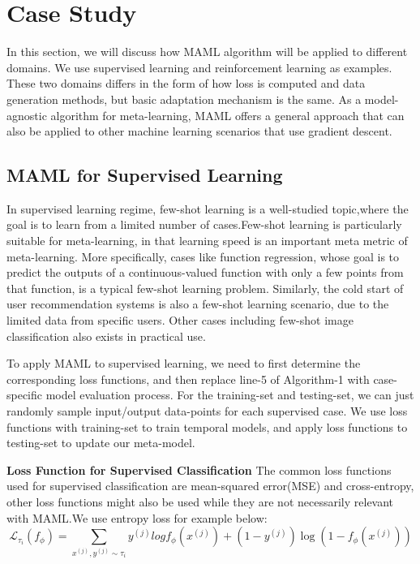 \section{Case Study}

In this section, we will discuss how MAML algorithm will be applied to different domains. We use supervised learning and reinforcement learning as examples. These two domains differs in the form of how loss is computed and data generation methods, but basic adaptation mechanism is the same. As a model-agnostic algorithm for meta-learning, MAML offers a general approach that can also be applied to other machine learning scenarios that use gradient descent.

\subsection{MAML for Supervised Learning}

In supervised learning regime, few-shot learning is a well-studied topic,where the goal is to learn from a limited number of cases.Few-shot learning is particularly suitable for meta-learning, in that learning speed is an important meta metric of meta-learning. More specifically, cases like function regression, whose goal is to predict the outputs of a continuous-valued function with only a few points from that function, is a typical few-shot learning problem. Similarly, the cold start of user  recommendation systems is also a few-shot learning scenario, due to the limited data from specific users. Other cases including few-shot image classification also exists in practical use.

To apply MAML to supervised learning, we need to first determine the corresponding loss functions, and then replace line-5 of Algorithm-1 with case-specific model evaluation process. For the training-set and testing-set, we can just randomly sample input/output data-points for each supervised case. We use loss functions with training-set to train temporal models, and apply loss functions to testing-set to update our meta-model.

\textbf{Loss Function for Supervised Classification}
The common loss functions used for supervised classification are mean-squared error(MSE) and cross-entropy, other loss functions might also be used while they are not necessarily relevant with MAML.We use entropy loss for example below:
\begin{equation}
    \label{loss-class}
    \mathcal{L}_{\tau_i}(f_\phi) = \sum_{x^{(j)},y^{(j)}\sim\tau_i} y^{(j)}log{f_\phi}(x^{(j)}) + (1-y^{(j)})\log(1-f_\phi(x^{(j)}))
    \tag{3}
\end{equation}

